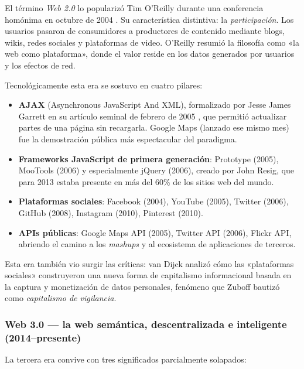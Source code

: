 El término \emph{Web 2.0} lo popularizó Tim O'Reilly durante una
conferencia homónima en octubre de 2004 \cite{oreilly2005what}. Su
característica distintiva: la \emph{participación}. Los usuarios
pasaron de consumidores a productores de contenido mediante blogs,
wikis, redes sociales y plataformas de video. O'Reilly resumió la
filosofía como «la web como plataforma», donde el valor reside en los
datos generados por usuarios y los efectos de red.

Tecnológicamente esta era se sostuvo en cuatro pilares:

\begin{itemize}
\item \textbf{AJAX} (Asynchronous JavaScript And XML), formalizado por
Jesse James Garrett en su artículo seminal de febrero de 2005
\cite{garrett2005ajax}, que permitió actualizar partes de una página
sin recargarla. Google Maps (lanzado ese mismo mes) fue la
demostración pública más espectacular del paradigma.
\item \textbf{Frameworks JavaScript de primera generación}: Prototype
(2005), MooTools (2006) y especialmente jQuery (2006), creado por
John Resig, que para 2013 estaba presente en más del 60\% de los
sitios web del mundo.
\item \textbf{Plataformas sociales}: Facebook (2004), YouTube (2005),
Twitter (2006), GitHub (2008), Instagram (2010), Pinterest (2010).
\item \textbf{APIs públicas}: Google Maps API (2005), Twitter API
(2006), Flickr API, abriendo el camino a los \emph{mashups} y al
ecosistema de aplicaciones de terceros.
\end{itemize}

Esta era también vio surgir las críticas: van Dijck
\cite{vandijck2013culture} analizó cómo las «plataformas sociales»
construyeron una nueva forma de capitalismo informacional basada en
la captura y monetización de datos personales, fenómeno que Zuboff
\cite{zuboff2019capitalismo} bautizó como \emph{capitalismo de
vigilancia}.

\subsubsection{Web 3.0 --- la web semántica, descentralizada e inteligente (2014--presente)}

La tercera era convive con tres significados parcialmente solapados:

